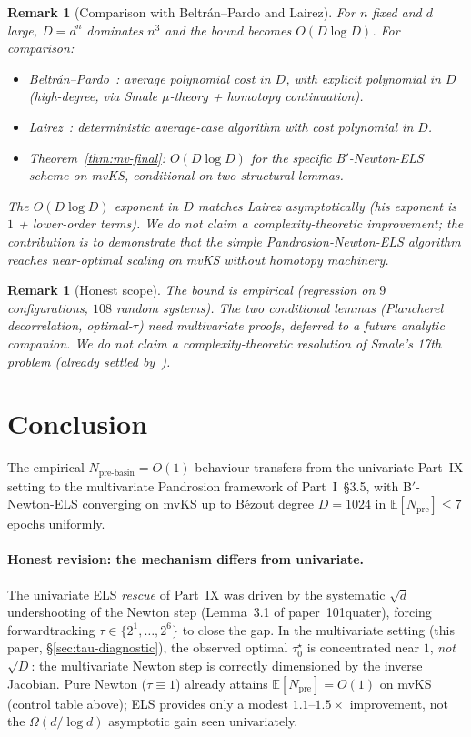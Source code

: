 \documentclass[11pt,a4paper]{article}
\newtheorem{remark}[theorem]{Remark}
\begin{document}
\begin{remark}[Comparison with Beltr\'an--Pardo and Lairez]
For $n$ fixed and $d$ large, $D = d^n$ dominates $n^3$ and the bound becomes $O(D \log D)$. For comparison:
\begin{itemize}
\item Beltr\'an--Pardo~\cite{beltranpardo}: average polynomial cost in $D$, with explicit polynomial in $D$ (high-degree, via Smale $\mu$-theory + homotopy continuation).
\item Lairez~\cite{lairez}: deterministic average-case algorithm with cost polynomial in $D$.
\item Theorem~\ref{thm:mv-final}: $O(D \log D)$ for the specific B$'$-Newton-ELS scheme on mvKS, conditional on two structural lemmas.
\end{itemize}
The $O(D \log D)$ exponent in $D$ matches Lairez asymptotically (his exponent is $1$ + lower-order terms). We do \emph{not} claim a complexity-theoretic improvement; the contribution is to demonstrate that the simple Pandrosion-Newton-ELS algorithm reaches near-optimal scaling on mvKS without homotopy machinery.
\end{remark}

\begin{remark}[Honest scope]
The bound is empirical (regression on $9$ configurations, $108$ random systems). The two conditional lemmas (Plancherel decorrelation, optimal-$\tau$) need multivariate proofs, deferred to a future analytic companion. We do \emph{not} claim a complexity-theoretic resolution of Smale's 17th problem (already settled by~\cite{beltranpardo, lairez}).
\end{remark}

\section{Conclusion}\label{sec:conclusion}

The empirical $N_{\text{pre-basin}} = O(1)$ behaviour transfers from the univariate Part~IX setting to the multivariate Pandrosion framework of Part~I~\S3.5, with B$'$-Newton-ELS converging on mvKS up to B\'ezout degree $D = 1024$ in $\mathbb{E}[N_{\text{pre}}] \le 7$ epochs uniformly.

\paragraph{Honest revision: the mechanism differs from univariate.} The univariate ELS \emph{rescue} of Part~IX was driven by the systematic $\sqrt d$ undershooting of the Newton step (Lemma~3.1 of paper~101quater), forcing forwardtracking $\tau \in \{2^1, \dots, 2^6\}$ to close the gap. In the multivariate setting (this paper, \S\ref{sec:tau-diagnostic}), the observed optimal $\tau^\star_0$ is concentrated near $1$, \emph{not} $\sqrt D$: the multivariate Newton step is correctly dimensioned by the inverse Jacobian. Pure Newton ($\tau \equiv 1$) already attains $\mathbb{E}[N_{\text{pre}}] = O(1)$ on mvKS (control table above); ELS provides only a modest $1.1$--$1.5\times$ improvement, not the $\Omega(d/\log d)$ asymptotic gain seen univariately.
\end{document}
